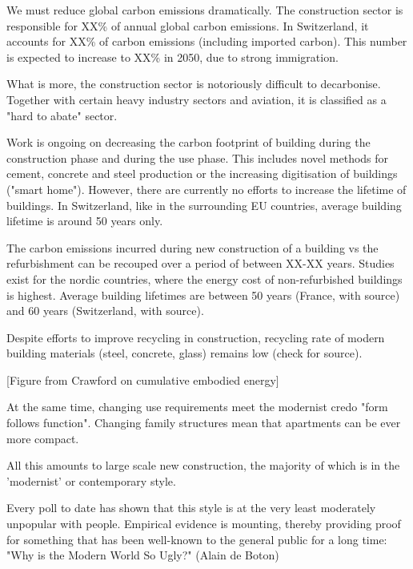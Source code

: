\documentclass{article}
\begin{document}
\begin{minipage}{0.55\textwidth}
    We must reduce global carbon emissions dramatically. The construction sector is responsible for XX\% of annual global carbon emissions. In Switzerland, it accounts for XX\% of carbon emissions (including imported carbon). This number is expected to increase to XX\% in 2050, due to strong immigration.
    
    What is more, the construction sector is notoriously difficult to decarbonise. Together with certain heavy industry sectors and aviation, it is classified as a "hard to abate" sector.
    
    Work is ongoing on decreasing the carbon footprint of building during the construction phase and during the use phase. This includes novel methods for cement, concrete and steel production or the increasing digitisation of buildings ("smart home"). However, there are currently no efforts to increase the lifetime of buildings. In Switzerland, like in the surrounding EU countries, average building lifetime is around 50 years only.
    
    The carbon emissions incurred during new construction of a building vs the refurbishment can be recouped over a period of between XX-XX years. Studies exist for the nordic countries, where the energy cost of non-refurbished buildings is highest. Average building lifetimes are between 50 years (France, with source) and 60 years (Switzerland, with source).
    
    Despite efforts to improve recycling in construction, recycling rate of modern building materials (steel, concrete, glass) remains low (check for source).
    
    [Figure from Crawford on cumulative embodied energy]
    
    At the same time, changing use requirements meet the modernist credo "form follows function". Changing family structures mean that apartments can be ever more compact.
    
    All this amounts to large scale new construction, the majority of which is in the 'modernist' or contemporary style.
    
    Every poll to date has shown that this style is at the very least moderately unpopular with people. Empirical evidence is mounting, thereby providing proof for something that has been well-known to the general public for a long time: "Why is the Modern World So Ugly?" (Alain de Boton)

\end{minipage}\hspace{15mm}
\end{document}
